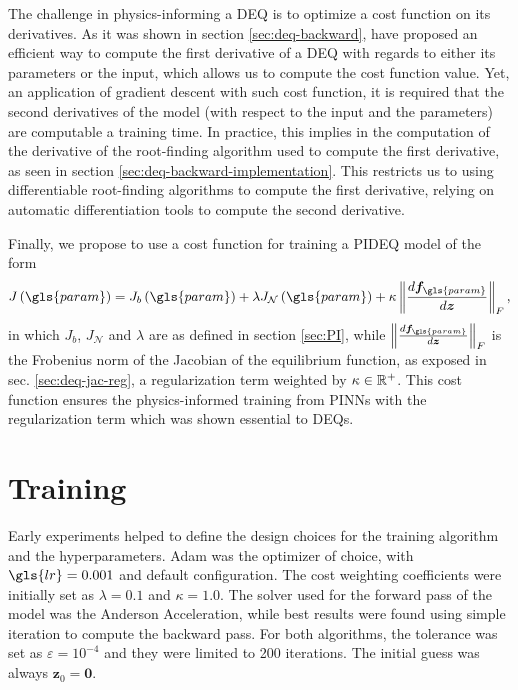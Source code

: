 The challenge in physics-informing a \gls{DEQ} is to optimize a cost function on its derivatives.
As it was shown in section \ref{sec:deq-backward}, \textcite{Bai2019} have proposed an efficient way to compute the first derivative of a \gls{DEQ} with regards to either its parameters or the input, which allows us to compute the cost function value.
Yet, an application of gradient descent with such cost function, it is required that the second derivatives of the model (with respect to the input and the parameters) are computable a training time.
In practice, this implies in the computation of the derivative of the root-finding algorithm used to compute the first derivative, as seen in section \ref{sec:deq-backward-implementation}.\footnotemark
{}
This restricts us to using differentiable root-finding algorithms to compute the first derivative, relying on automatic differentiation tools to compute the second derivative.

Finally, we propose to use a cost function for training a \gls{PIDEQ} model of the form \[
    J\left( \gls{param} \right) = J_b\left( \gls{param} \right) + \lambda J_{\mathcal{N}}\left( \gls{param} \right) + \kappa \left\lVert \frac{d \bm{f}_{\gls{param}}}{d \bm{z}}\right\rVert_F
,\] 
in which $J_b$, $J_{\mathcal{N}}$ and $\lambda$ are as defined in section \ref{sec:PI}, while $\left\lVert \frac{d \bm{f}_{\gls{param}}}{d \bm{z}}\right\rVert_F$ is the Frobenius norm of the Jacobian of the equilibrium function, as exposed in sec. \ref{sec:deq-jac-reg}, a regularization term weighted by $\kappa \in \mathbb{R}^+$.
This cost function ensures the physics-informed training from \gls{PINN}s with the regularization term which was shown essential to \gls{DEQ}s.

\section{Training}

Early experiments helped to define the design choices for the training algorithm and the hyperparameters.
Adam\cite{kingma_adam_2015} was the optimizer of choice, with $\gls{lr}=0.001$ and default configuration.
The cost weighting coefficients were initially set as $\lambda=0.1$ and $\kappa=1.0$.
The solver used for the forward pass of the model was the Anderson Acceleration\cite{walker_anderson_2011}, while best results were found using simple iteration to compute the backward pass.
For both algorithms, the tolerance was set as $\varepsilon=10^{-4}$ and they were limited to 200 iterations.
The initial guess was always $\bm{z}_0=\bm{0}$.


